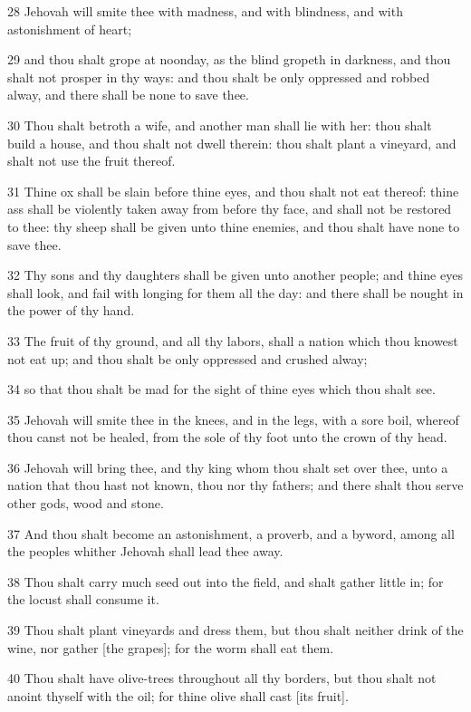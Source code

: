 \par 28 Jehovah will smite thee with madness, and with blindness, and with astonishment of heart;
\par 29 and thou shalt grope at noonday, as the blind gropeth in darkness, and thou shalt not prosper in thy ways: and thou shalt be only oppressed and robbed alway, and there shall be none to save thee.
\par 30 Thou shalt betroth a wife, and another man shall lie with her: thou shalt build a house, and thou shalt not dwell therein: thou shalt plant a vineyard, and shalt not use the fruit thereof.
\par 31 Thine ox shall be slain before thine eyes, and thou shalt not eat thereof: thine ass shall be violently taken away from before thy face, and shall not be restored to thee: thy sheep shall be given unto thine enemies, and thou shalt have none to save thee.
\par 32 Thy sons and thy daughters shall be given unto another people; and thine eyes shall look, and fail with longing for them all the day: and there shall be nought in the power of thy hand.
\par 33 The fruit of thy ground, and all thy labors, shall a nation which thou knowest not eat up; and thou shalt be only oppressed and crushed alway;
\par 34 so that thou shalt be mad for the sight of thine eyes which thou shalt see.
\par 35 Jehovah will smite thee in the knees, and in the legs, with a sore boil, whereof thou canst not be healed, from the sole of thy foot unto the crown of thy head.
\par 36 Jehovah will bring thee, and thy king whom thou shalt set over thee, unto a nation that thou hast not known, thou nor thy fathers; and there shalt thou serve other gods, wood and stone.
\par 37 And thou shalt become an astonishment, a proverb, and a byword, among all the peoples whither Jehovah shall lead thee away.
\par 38 Thou shalt carry much seed out into the field, and shalt gather little in; for the locust shall consume it.
\par 39 Thou shalt plant vineyards and dress them, but thou shalt neither drink of the wine, nor gather [the grapes]; for the worm shall eat them.
\par 40 Thou shalt have olive-trees throughout all thy borders, but thou shalt not anoint thyself with the oil; for thine olive shall cast [its fruit].
